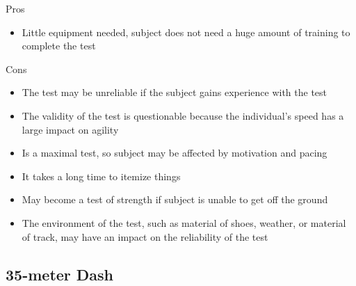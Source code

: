 \documentclass[12pt]{article}
\begin{document}
\begin{minipage}{\textwidth}
\end{minipage}
\begin{minipage}[t]{0.5\textwidth}
    \begin{center}Pros\end{center}
    \begin{itemize}
        \item Little equipment needed, subject does not need a huge amount of training to complete the test
    \end{itemize}
\end{minipage}
\begin{minipage}[t]{0.5\textwidth}
    \begin{center}Cons\end{center}
    \begin{itemize}
        \item The test may be unreliable if the subject gains experience with the test
        \item The validity of the test is questionable because the individual's speed has a large impact on agility
        \item Is a maximal test, so subject may be affected by motivation and pacing
        \item It takes a long time to itemize things
        \item May become a test of strength if subject is unable to get off the ground
        \item The environment of the test, such as material of shoes, weather, or material of track, may have an impact on the reliability of the test
    \end{itemize}
\end{minipage}

\subsection*{35-meter Dash}
\end{document}
